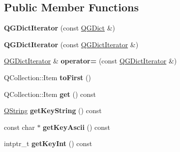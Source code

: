 \subsection*{Public Member Functions}
\begin{DoxyCompactItemize}
\item 
\mbox{\label{class_q_g_dict_iterator_ad3a8cee70c155fb51cdb49f4d0200fff}} 
{\bfseries Q\+G\+Dict\+Iterator} (const \mbox{\hyperlink{class_q_g_dict}{Q\+G\+Dict}} \&)
\item 
\mbox{\label{class_q_g_dict_iterator_a877692de8c5afd9fbc1cad31022c6bdc}} 
{\bfseries Q\+G\+Dict\+Iterator} (const \mbox{\hyperlink{class_q_g_dict_iterator}{Q\+G\+Dict\+Iterator}} \&)
\item 
\mbox{\label{class_q_g_dict_iterator_a4ae06e135ad6a141c8c682051eea4d89}} 
\mbox{\hyperlink{class_q_g_dict_iterator}{Q\+G\+Dict\+Iterator}} \& {\bfseries operator=} (const \mbox{\hyperlink{class_q_g_dict_iterator}{Q\+G\+Dict\+Iterator}} \&)
\item 
\mbox{\label{class_q_g_dict_iterator_a67e4f848a3e0e4577dd862e410b71d5b}} 
Q\+Collection\+::\+Item {\bfseries to\+First} ()
\item 
\mbox{\label{class_q_g_dict_iterator_a1ed95b56163469e44b4b662e2ef384cf}} 
Q\+Collection\+::\+Item {\bfseries get} () const
\item 
\mbox{\label{class_q_g_dict_iterator_acb85d719ea0b2f8527871e3cc50a3ffa}} 
\mbox{\hyperlink{class_q_string}{Q\+String}} {\bfseries get\+Key\+String} () const
\item 
\mbox{\label{class_q_g_dict_iterator_a783dbbe77b2fcab19baa8066a9f7ac47}} 
const char $\ast$ {\bfseries get\+Key\+Ascii} () const
\item 
\mbox{\label{class_q_g_dict_iterator_ab111cc97aa84e6e6333b0c9664a778a8}} 
intptr\+\_\+t {\bfseries get\+Key\+Int} () const
\item 
\mbox{\label{class_q_g_dict_iterator_a6e457860ab64ae064011949e28359637}} 

\end{DoxyCompactItemize}
